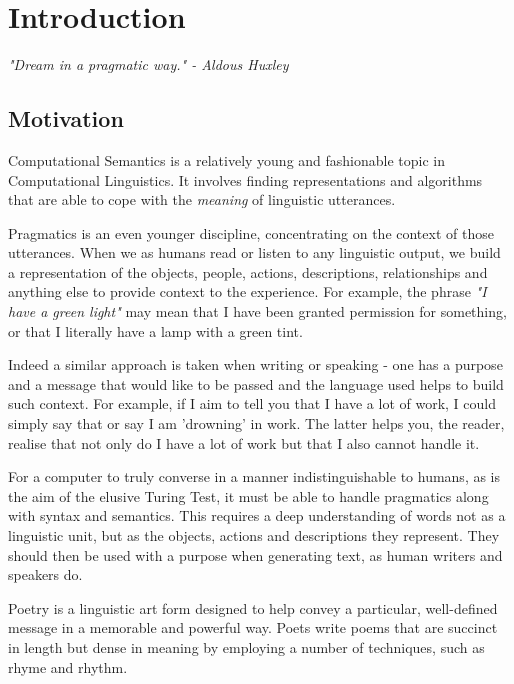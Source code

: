 \chapter{Introduction}
\ifpdf
    \graphicspath{{Introduction/IntroductionFigs/PNG/}{Introduction/IntroductionFigs/PDF/}{Introduction/IntroductionFigs/}}
\else
    \graphicspath{{Introduction/IntroductionFigs/EPS/}{Introduction/IntroductionFigs/}}
\fi
\emph{"Dream in a pragmatic way." - Aldous Huxley}
\section{Motivation}

Computational Semantics is a relatively young and fashionable topic in Computational Linguistics. It involves finding representations and algorithms that are able to cope with the \textit{meaning} of linguistic utterances.

Pragmatics is an even younger discipline, concentrating on the context of those utterances. When we as humans read or listen to any linguistic output, we build a representation of the objects, people, actions, descriptions, relationships and anything else to provide context to the experience. For example, the phrase \textit{"I have a green light"} may mean that I have been granted permission for something, or that I literally have a lamp with a green tint. 

Indeed a similar approach is taken when writing or speaking - one has a purpose and a message that would like to be passed and the language used helps to build such context. For example, if I aim to tell you that I have a lot of work, I could simply say that or say I am 'drowning' in work. The latter helps you, the reader, realise that not only do I have a lot of work but that I also cannot handle it.

For a computer to truly converse in a manner indistinguishable to humans, as is the aim of the elusive Turing Test, it must be able to handle pragmatics along with syntax and semantics. This requires a deep understanding of words not as a linguistic unit, but as the objects, actions and descriptions they represent. They should then be used with a purpose when generating text, as human writers and speakers do.

Poetry is a linguistic art form designed to help convey a particular, well-defined message in a memorable and powerful way. Poets write poems that are succinct in length but dense in meaning by employing a number of techniques, such as rhyme and rhythm. 


